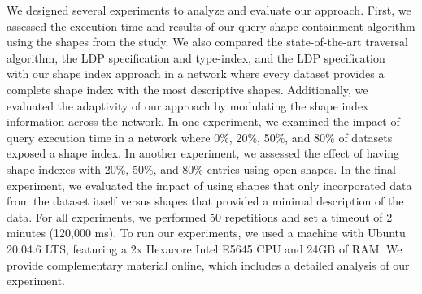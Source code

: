 We designed several experiments to analyze and evaluate our approach.
First, we assessed the execution time and results of our query-shape containment algorithm using the shapes from the study.
We also compared the state-of-the-art traversal algorithm, the LDP specification and type-index, and the LDP specification~\cite{Taelman2023} with our shape index approach in a network where every dataset provides a complete shape index with the most descriptive shapes.
Additionally, we evaluated the adaptivity of our approach by modulating the shape index information across the network.
In one experiment, we examined the impact of query execution time in a network where 0\%, 20\%, 50\%, and 80\% of datasets exposed a shape index.
In another experiment, we assessed the effect of having shape indexes with 20\%, 50\%, and 80\% entries using open shapes.
In the final experiment, we evaluated the impact of using shapes that only incorporated data from the dataset itself versus shapes that provided a minimal description of the data.
For all experiments, we performed 50 repetitions and set a timeout of 2 minutes (120,000 ms).
To run our experiments, we used a machine with Ubuntu 20.04.6 LTS, featuring a 2x Hexacore Intel E5645 CPU and 24GB of RAM.
We provide complementary material online, which includes a detailed analysis of our experiment.~

\iffalse
PROVIDE LINK FOR EXPERIMENTS AND SHAPES

102x pcgen3 nodes
https://doc.ilabt.imec.be/ilabt/virtualwall/hardware.html#virtual-wall-2
\fi
